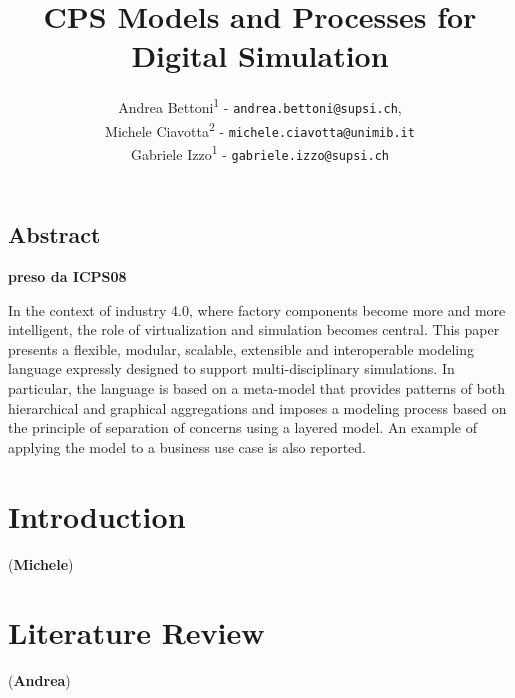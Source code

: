 \documentclass{riverk}
\begin{document}
\setcounter{article}{7}

\begin{opening}
\title[CPS Models and Processes for Digital Simulation]{CPS Models and Processes for Digital Simulation %
            }
\author{Andrea Bettoni\textsuperscript{1} - \texttt{andrea.bettoni@supsi.ch},\\
	Michele Ciavotta\textsuperscript{2} - \texttt{michele.ciavotta@unimib.it}\\
	Gabriele Izzo\textsuperscript{1} - \texttt{gabriele.izzo@supsi.ch}}
\end{opening}

\subsection*{Abstract}
\textbf{preso da ICPS08}

In the context of industry 4.0, where factory components become more and more intelligent, the role of virtualization and simulation becomes central. This paper presents a flexible, modular, scalable, extensible and interoperable modeling language expressly designed to support multi-disciplinary simulations. In particular, the language is based on a meta-model that provides patterns of both hierarchical and graphical aggregations and imposes a modeling process based on the principle of separation of concerns using a layered model. An example of applying the model to a business use case is also reported. 


\section{Introduction} 
(\textbf{Michele})


\section{Literature Review}
(\textbf{Andrea})
\end{document}
